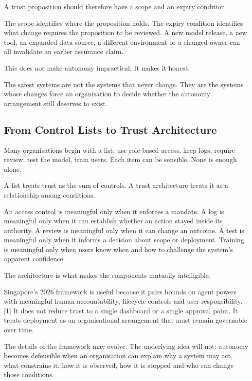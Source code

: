A trust proposition should therefore have a scope and an expiry
condition.

The scope identifies where the proposition holds. The expiry condition
identifies what change requires the proposition to be reviewed. A new
model release, a new tool, an expanded data source, a different
environment or a changed owner can all invalidate an earlier assurance
claim.

This does not make autonomy impractical. It makes it honest.

The safest systems are not the systems that never change. They are the
systems whose changes force an organisation to decide whether the
autonomy arrangement still deserves to exist.

\subsection{From Control Lists to Trust
Architecture}\label{from-control-lists-to-trust-architecture}

Many organisations begin with a list: use role-based access, keep logs,
require review, test the model, train users. Each item can be sensible.
None is enough alone.

A list treats trust as the sum of controls. A trust architecture treats
it as a relationship among conditions.

An access control is meaningful only when it enforces a mandate. A log
is meaningful only when it can establish whether an action stayed inside
its authority. A review is meaningful only when it can change an
outcome. A test is meaningful only when it informs a decision about
scope or deployment. Training is meaningful only when users know when
and how to challenge the system's apparent confidence.

The architecture is what makes the components mutually intelligible.

Singapore's 2026 framework is useful because it pairs bounds on agent
powers with meaningful human accountability, lifecycle controls and user
responsibility.{[}1{]} It does not reduce trust to a single dashboard or
a single approval point. It treats deployment as an organisational
arrangement that must remain governable over time.

The details of the framework may evolve. The underlying idea will not:
autonomy becomes defensible when an organisation can explain why a
system may act, what constrains it, how it is observed, how it is
stopped and who can change those conditions.

